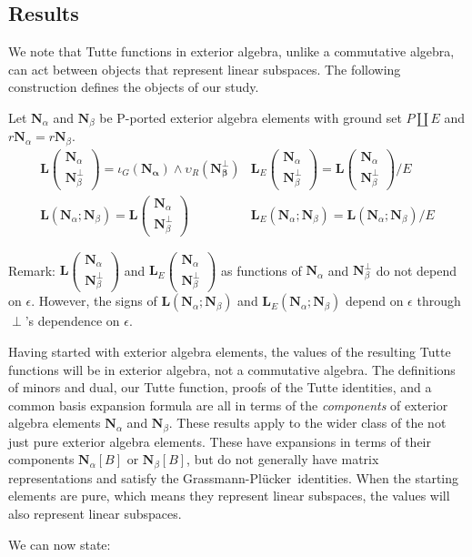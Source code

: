 \documentclass[Unicode]{cedram-alco}
\newcommand{\ext}[1]{\ensuremath{\mathbf{#1}}}
\newcommand{\Plucker}{Pl\"{u}cker\ }
\newcommand{\eNal}{\ensuremath{\ext{N}_{\alpha}}}
\newcommand{\eNbePe}{\ensuremath{\ext{N}_{\beta}^{\perp}}}
\newcommand{\eNbe}{\ensuremath{\ext{N}_\beta}}
\newcommand{\Is}{\ensuremath{\iota}}
\newcommand{\Vs}{\ensuremath{\upsilon}}
\newcommand{\dunion}{\coprod}
\newcommand{\extLVert}[2]{\ext{L}\left( \begin{array}{c} {#1}\\ {#2} \end{array} \right)}
\newcommand{\LVert}[2]{\ext{L}\left( \begin{array}{c} {#1}\\ {#2} \end{array} \right)}
\newcommand{\LVertSub}[3]{\ext{L}_{#1}\left( \begin{array}{c} {#2}\\ {#3} \end{array} \right)}
\newcommand{\LHor}[2]{\ext{L}\left( {#1}; {#2} \right)}
\newcommand{\LHorSub}[3]{\ext{L}_{#1}\left(  {#2}; {#3}  \right)}
\begin{document}
\subsection{Results}

We note that Tutte functions in exterior algebra, unlike a
commutative algebra, can act between objects that represent
linear subspaces.
The following construction defines the objects of our study.


\begin{defi}\label{LDefs}
  Let $\ext{N}_\alpha$ and $\ext{N}_\beta$ be P-ported
  exterior algebra elements
  with ground set $P\dunion E$ and $r\ext{N}_\alpha=r\ext{N}_\beta$.
  \begin{equation}
  \begin{array}{cc}
    \LVert{\eNal}{\eNbePe} = \Is_G(\ext{N_\alpha})\wedge\Vs_R(\ext{N_{\beta}^\perp}) &
    \LVertSub{E}{\eNal}{\eNbePe} = \LVert{\eNal}{\eNbePe}/E\\
    \LHor{\eNal}{\eNbe}=\extLVert{\eNal}{\eNbePe} &
    \LHorSub{E}{\eNal}{\eNbe}=\LHor{\eNal}{\eNbe}/E
  \end{array}
  \end{equation}
\end{defi}


Remark: $\LVert{\eNal}{\eNbePe}$ and $\LVertSub{E}{\eNal}{\eNbePe}$ as functions of
$\eNal$ and $\eNbePe$ do not depend on $\epsilon$.
However, the signs of $\LHor{\eNal}{\eNbe}$
and $\LHorSub{E}{\eNal}{\eNbe}$ depend on $\epsilon$ through $\perp$'s dependence
on $\epsilon$.  




Having started with exterior algebra elements, the values of the
resulting Tutte functions will be in exterior algebra, not
a commutative algebra.
The definitions of minors and dual, our Tutte function, proofs
of the Tutte identities, and a common basis expansion formula
are all in terms of the \emph{components} of exterior
algebra elements $\ext{N}_\alpha$ and $\ext{N}_\beta$.  These results
apply to the wider class of the not just pure exterior algebra
elements.  These have expansions in terms of their components $\ext{N}_\alpha[B]$ or
$\ext{N}_\beta[B]$, but do not generally have matrix representations and
satisfy the Grassmann-\Plucker identities.
When the starting elements are
pure, which means they represent linear subspaces,
the values will also represent linear subspaces.



We can now state:
\end{document}

